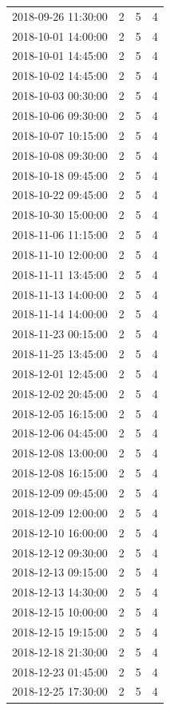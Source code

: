 \begin{tabular}{lrrr}
2018-09-26 11:30:00 & 2 & 5 & 4 \\
2018-10-01 14:00:00 & 2 & 5 & 4 \\
2018-10-01 14:45:00 & 2 & 5 & 4 \\
2018-10-02 14:45:00 & 2 & 5 & 4 \\
2018-10-03 00:30:00 & 2 & 5 & 4 \\
2018-10-06 09:30:00 & 2 & 5 & 4 \\
2018-10-07 10:15:00 & 2 & 5 & 4 \\
2018-10-08 09:30:00 & 2 & 5 & 4 \\
2018-10-18 09:45:00 & 2 & 5 & 4 \\
2018-10-22 09:45:00 & 2 & 5 & 4 \\
2018-10-30 15:00:00 & 2 & 5 & 4 \\
2018-11-06 11:15:00 & 2 & 5 & 4 \\
2018-11-10 12:00:00 & 2 & 5 & 4 \\
2018-11-11 13:45:00 & 2 & 5 & 4 \\
2018-11-13 14:00:00 & 2 & 5 & 4 \\
2018-11-14 14:00:00 & 2 & 5 & 4 \\
2018-11-23 00:15:00 & 2 & 5 & 4 \\
2018-11-25 13:45:00 & 2 & 5 & 4 \\
2018-12-01 12:45:00 & 2 & 5 & 4 \\
2018-12-02 20:45:00 & 2 & 5 & 4 \\
2018-12-05 16:15:00 & 2 & 5 & 4 \\
2018-12-06 04:45:00 & 2 & 5 & 4 \\
2018-12-08 13:00:00 & 2 & 5 & 4 \\
2018-12-08 16:15:00 & 2 & 5 & 4 \\
2018-12-09 09:45:00 & 2 & 5 & 4 \\
2018-12-09 12:00:00 & 2 & 5 & 4 \\
2018-12-10 16:00:00 & 2 & 5 & 4 \\
2018-12-12 09:30:00 & 2 & 5 & 4 \\
2018-12-13 09:15:00 & 2 & 5 & 4 \\
2018-12-13 14:30:00 & 2 & 5 & 4 \\
2018-12-15 10:00:00 & 2 & 5 & 4 \\
2018-12-15 19:15:00 & 2 & 5 & 4 \\
2018-12-18 21:30:00 & 2 & 5 & 4 \\
2018-12-23 01:45:00 & 2 & 5 & 4 \\
2018-12-25 17:30:00 & 2 & 5 & 4 \\

\end{tabular}
